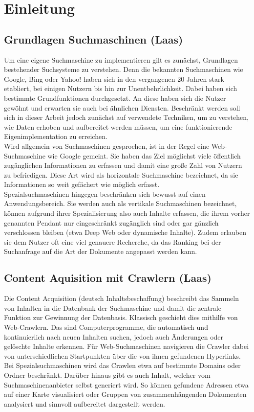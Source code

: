 \chapter{Einleitung}

\section{Grundlagen Suchmaschinen (Laas)}
Um eine eigene Suchmaschine zu implementieren gilt es zunächst, Grundlagen bestehender Suchsysteme zu verstehen. Denn die bekannten Suchmaschinen wie Google, Bing oder Yahoo! haben sich in den vergangenen 20 Jahren stark etabliert, bei einigen Nutzern bis hin zur Unentbehrlichkeit. Dabei haben sich bestimmte Grundfunktionen durchgesetzt. An diese haben sich die Nutzer gewöhnt und erwarten sie auch bei ähnlichen Diensten. Beschränkt werden soll sich in dieser Arbeit jedoch zunächst auf verwendete Techniken, um zu verstehen, wie Daten erhoben und aufbereitet werden müssen, um eine funktionierende Eigenimplementation zu erreichen.\\
Wird allgemein von Suchmaschinen gesprochen, ist in der Regel eine Web-Suchmaschine wie Google gemeint. Sie haben das Ziel möglichst viele öffentlich zugänglichen Informationen zu erfassen und damit eine große Zahl von Nutzern zu befriedigen. Diese Art wird als horizontale Suchmaschine bezeichnet, da sie Informationen so weit gefächert wie möglich erfasst.\\
Spezialsuchmaschinen hingegen beschränken sich bewusst auf einen Anwendungsbereich. Sie werden auch als vertikale Suchmaschinen bezeichnet, können aufgrund ihrer Spezialisierung also auch Inhalte erfassen, die ihrem vorher genannten Pendant nur eingeschränkt zugänglich sind oder gar gänzlich verschlossen bleiben (etwa Deep Web oder dynamische Inhalte). Zudem erlauben sie dem Nutzer oft eine viel genauere Recherche, da das Ranking bei der Suchanfrage auf die Art der Dokumente angepasst werden kann.

\section{Content Aquisition mit Crawlern (Laas)}
Die Content Acquisition (deutsch Inhaltsbeschaffung) beschreibt das Sammeln von Inhalten in die Datenbank der Suchmaschine und damit die zentrale Funktion zur Gewinnung der Datenbasis. Klassisch geschieht dies mithilfe von Web-Crawlern. Das sind Computerprogramme, die automatisch und kontinuierlich nach neuen Inhalten suchen, jedoch auch Änderungen oder gelöschte Inhalte erkennen. Für Web-Suchmaschinen navigieren die Crawler dabei von unterschiedlichen Startpunkten über die von ihnen gefundenen Hyperlinks. Bei Spezialsuchmaschinen wird das Crawlen etwa auf bestimmte Domains oder Ordner beschränkt. Darüber hinaus gibt es auch Inhalt, welcher vom Suchmaschinenanbieter selbst generiert wird. So können gefundene Adressen etwa auf einer Karte visualisiert oder Gruppen von zusammenhängenden Dokumenten analysiert und sinnvoll aufbereitet dargestellt werden.

